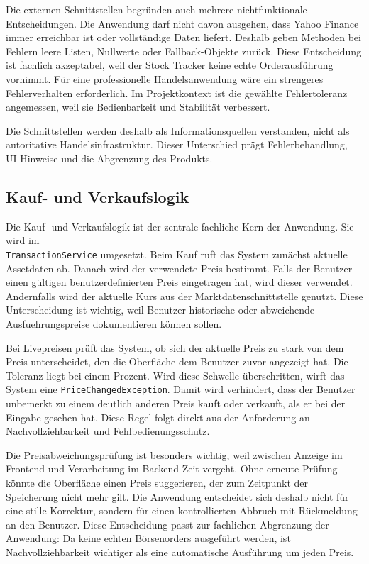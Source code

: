 \documentclass[12pt,a4paper]{article}
\begin{document}
Die externen Schnittstellen begründen auch mehrere nichtfunktionale Entscheidungen. Die Anwendung darf nicht davon ausgehen, dass Yahoo Finance immer erreichbar ist oder vollständige Daten liefert. Deshalb geben Methoden bei Fehlern leere Listen, Nullwerte oder Fallback-Objekte zurück. Diese Entscheidung ist fachlich akzeptabel, weil der Stock Tracker keine echte Orderausführung vornimmt. Für eine professionelle Handelsanwendung wäre ein strengeres Fehlerverhalten erforderlich. Im Projektkontext ist die gewählte Fehlertoleranz angemessen, weil sie Bedienbarkeit und Stabilität verbessert.

Die Schnittstellen werden deshalb als Informationsquellen verstanden, nicht als autoritative Handelsinfrastruktur. Dieser Unterschied prägt Fehlerbehandlung, UI-Hinweise und die Abgrenzung des Produkts.

\subsection{Kauf- und Verkaufslogik}

Die Kauf- und Verkaufslogik ist der zentrale fachliche Kern der Anwendung. Sie wird im \\ \texttt{TransactionService} umgesetzt. Beim Kauf ruft das System zunächst aktuelle Assetdaten ab. Danach wird der verwendete Preis bestimmt. Falls der Benutzer einen gültigen benutzerdefinierten Preis eingetragen hat, wird dieser verwendet. Andernfalls wird der aktuelle Kurs aus der Marktdatenschnittstelle genutzt. Diese Unterscheidung ist wichtig, weil Benutzer historische oder abweichende Ausfuehrungspreise dokumentieren können sollen.

Bei Livepreisen prüft das System, ob sich der aktuelle Preis zu stark von dem Preis unterscheidet, den die Oberfläche dem Benutzer zuvor angezeigt hat. Die Toleranz liegt bei einem Prozent. Wird diese Schwelle überschritten, wirft das System eine \texttt{PriceChangedException}. Damit wird verhindert, dass der Benutzer unbemerkt zu einem deutlich anderen Preis kauft oder verkauft, als er bei der Eingabe gesehen hat. Diese Regel folgt direkt aus der Anforderung an Nachvollziehbarkeit und Fehlbedienungsschutz.

Die Preisabweichungsprüfung ist besonders wichtig, weil zwischen Anzeige im Frontend und Verarbeitung im Backend Zeit vergeht. Ohne erneute Prüfung könnte die Oberfläche einen Preis suggerieren, der zum Zeitpunkt der Speicherung nicht mehr gilt. Die Anwendung entscheidet sich deshalb nicht für eine stille Korrektur, sondern für einen kontrollierten Abbruch mit Rückmeldung an den Benutzer. Diese Entscheidung passt zur fachlichen Abgrenzung der Anwendung: Da keine echten Börsenorders ausgeführt werden, ist Nachvollziehbarkeit wichtiger als eine automatische Ausführung um jeden Preis.
\end{document}
